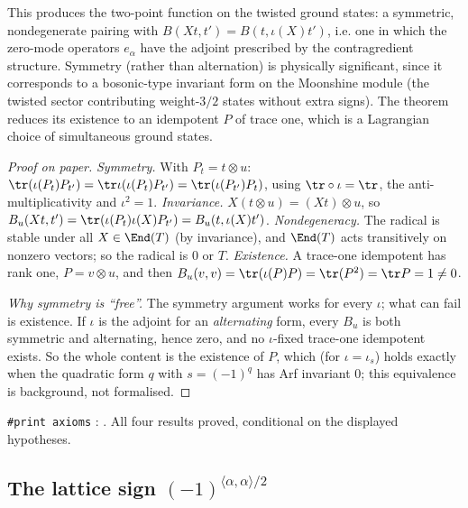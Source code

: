 \begin{physics}
This produces the two-point function on the twisted ground states: a symmetric, nondegenerate pairing with $B(Xt,t')=B(t,\iota(X)t')$, i.e. one in which the zero-mode operators $e_\alpha$ have the adjoint prescribed by the contragredient structure. Symmetry (rather than alternation) is physically significant, since it corresponds to a bosonic-type invariant form on the Moonshine module (the twisted sector contributing weight-$3/2$ states without extra signs). The theorem reduces its existence to an idempotent $P$ of trace one, which is a Lagrangian choice of simultaneous ground states.
\end{physics}
\begin{proof}[Proof on paper]
\emph{Symmetry.} With $P_t=t\otimes u$: $\tr(\iota(P_t)P_{t'})=\tr\iota(\iota(P_t)P_{t'})=
\tr(\iota(P_{t'})P_t)$, using $\tr\circ\iota=\tr$, the anti-multiplicativity and $\iota^2=1$.
\emph{Invariance.} $X(t\otimes u)=(Xt)\otimes u$, so $B_u(Xt,t')=\tr(\iota(P_t)\iota(X)P_{t'})=
B_u(t,\iota(X)t')$.  \emph{Nondegeneracy.} The radical is stable under all $X\in\End(T)$ (by
invariance), and $\End(T)$ acts transitively on nonzero vectors; so the radical is $0$ or $T$.
\emph{Existence.} A trace-one idempotent has rank one, $P=v\otimes u$, and then
$B_u(v,v)=\tr(\iota(P)P)=\tr(P^2)=\tr P=1\ne0$.

\emph{Why symmetry is ``free''.}  The symmetry argument works for every $\iota$; what can fail is
existence.  If $\iota$ is the adjoint for an \emph{alternating} form, every $B_u$ is both symmetric
and alternating, hence zero, and no $\iota$-fixed trace-one idempotent exists.  So the whole
content is the existence of $P$, which (for $\iota=\iota_s$) holds exactly when the quadratic form
$q$ with $s=(-1)^q$ has Arf invariant $0$; this equivalence is background, not formalised.
\end{proof}
\begin{status}
\texttt{\#print axioms} : .  All four results proved, conditional on the displayed hypotheses.
\end{status}

\subsection{The lattice sign \texorpdfstring{$(-1)^{\langle\alpha,\alpha\rangle/2}$}{(-1)^(alpha,alpha)/2}}

